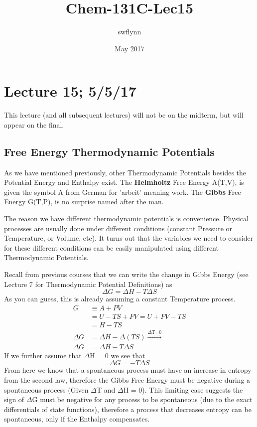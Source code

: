 \documentclass{article}
\title{Chem-131C-Lec15}
\author{swflynn }
\date{May 2017}
\begin{document}
\maketitle

\section*{Lecture 15; 5/5/17}
This lecture (and all subsequent lectures) will not be on the midterm, but will appear on the final.

\subsection*{Free Energy Thermodynamic Potentials}
As we have mentioned previously, other Thermodynamic Potentials besides the Potential Energy and Enthalpy exist. 
The \textbf{Helmholtz} Free Energy A(T,V), is given the symbol A from German for 'arbeit' meaning work. 
The \textbf{Gibbs} Free Energy G(T,P), is no surprise named after the man. 

The reason we have different thermodynamic potentials is convenience. 
Physical processes are usually done under different conditions (constant Pressure or Temperature, or Volume, etc). 
It turns out that the variables we need to consider for these different conditions can be easily manipulated using  different Thermodynamic Potentials.

Recall from previous courses that we can write the change in Gibbs Energy (see Lecture 7 for Thermodynamic Potential Definitions) as
\begin{equation}
    \Delta G = \Delta H - T\Delta S
\end{equation}
As you can guess, this is already assuming a constant Temperature process. 
\begin{equation}
    \begin{split}
        G &\equiv A + PV \\
        &= U - TS + PV = U + PV - TS \\
        &= H - TS \\
        \Delta G &= \Delta H - \Delta(TS) \xrightarrow{\text{$\Delta$T=0}} \\
        \Delta G &= \Delta H -T\Delta S
    \end{split}
\end{equation}
If we further assume that $\Delta$H = 0 we see that 
\begin{equation}
    \Delta G = - T\Delta S
\end{equation}
From here we know that a spontaneous process must have an increase in entropy from the second law, therefore the Gibbs Free Energy must be negative during a spontaneous process (Given $\Delta$T and $\Delta$H  = 0). 
This limiting case suggests the sign of $\Delta$G must be negative for any process to be spontaneous (due to the exact differentials of state functions), therefore a process that decreases entropy can be spontaneous, only if the Enthalpy compensates. 
\end{document}
